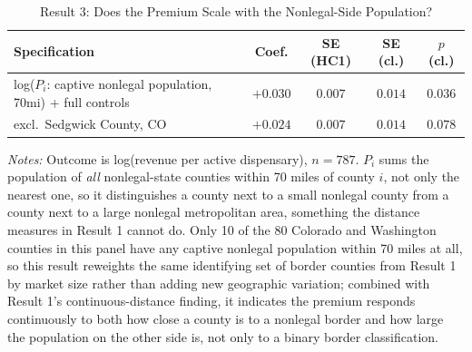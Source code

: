 \begin{table}[htbp]
\centering
\caption{Result 3: Does the Premium Scale with the Nonlegal-Side Population?}
\label{tab:result3}
\small
\begin{tabular}{p{7.4cm}cccc}
\toprule
Specification & Coef. & SE (HC1) & SE (cl.) & $p$ (cl.) \\
\midrule
log($P_i$: captive nonlegal population, 70mi) + full controls & $+0.030$ & $0.007$ & $0.014$ & $0.036$ \\
\quad excl.\ Sedgwick County, CO & $+0.024$ & $0.007$ & $0.014$ & $0.078$ \\
\bottomrule
\end{tabular}
\begin{minipage}{0.95\textwidth}
\vspace{0.3em}
\footnotesize
\textit{Notes:} Outcome is log(revenue per active dispensary), $n=787$. $P_i$ sums the population of
\emph{all} nonlegal-state counties within 70 miles of county $i$, not only the nearest one, so it
distinguishes a county next to a small nonlegal county from a county next to a large nonlegal metropolitan
area, something the distance measures in Result 1 cannot do. Only 10 of the 80 Colorado and Washington
counties in this panel have any captive nonlegal population within 70 miles at all, so this result reweights
the same identifying set of border counties from Result 1 by market size rather than adding new geographic
variation; combined with Result 1's continuous-distance finding, it indicates the premium responds
continuously to both how close a county is to a nonlegal border and how large the population on the other
side is, not only to a binary border classification.
\end{minipage}
\end{table}
